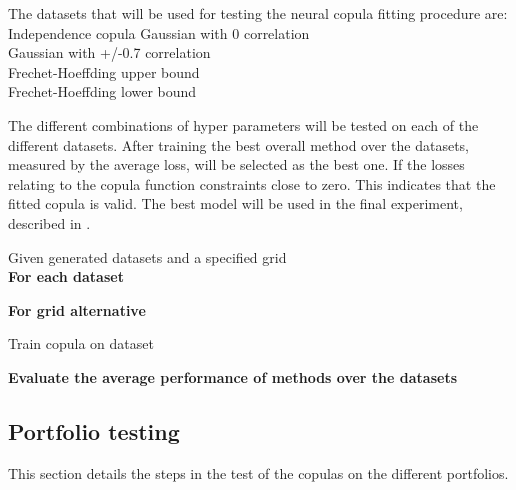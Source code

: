 The datasets that will be used for testing the neural copula fitting procedure are:\\ 
Independence copula Gaussian with 0 correlation\\
Gaussian with +/-0.7 correlation\\
Frechet-Hoeffding upper bound\\
Frechet-Hoeffding lower bound\\




The different combinations of hyper parameters will be tested on each of the different datasets. After training the best overall method over the datasets, measured by the average loss, will be selected as the best one. If the losses relating to the copula function constraints close to zero. This indicates that the fitted copula is valid. The best model will be used in the final experiment, described in .  

\begin{generalinstructions}
Given generated datasets and a specified grid\\
\textbf{For each dataset}
\begin{compactitem}
    \item \textbf{For grid alternative}
    \begin{compactitem}
            \item Train copula on dataset
        \end{compactitem}
\end{compactitem}
\textbf{Evaluate the average performance of methods over the datasets}
\end{generalinstructions}

 


\subsection{Portfolio testing}\label{sec:PortfolioTesting}
This section details the steps in the test of the copulas on the different portfolios. 

